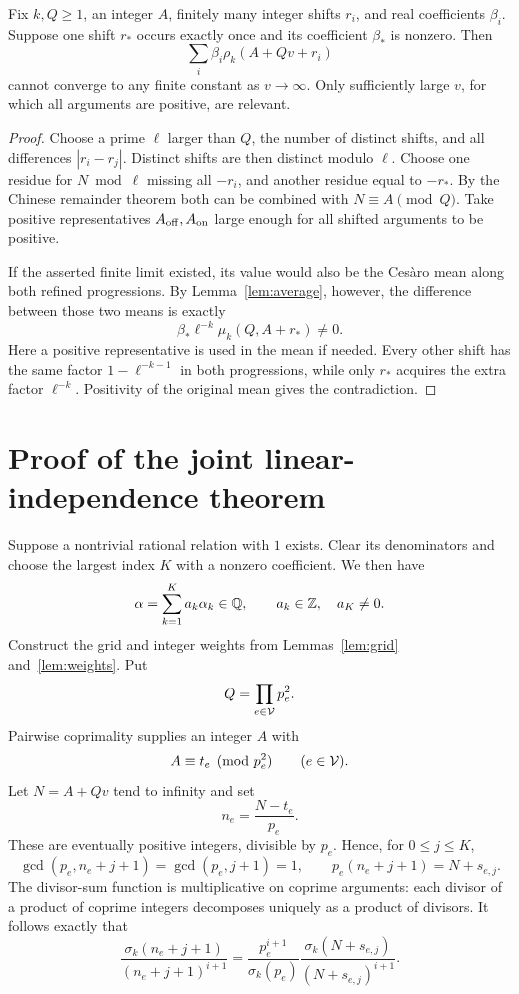 \begin{proposition}\label{prop:nolimit}
Fix $k,Q\geq1$, an integer $A$, finitely many integer shifts $r_i$,
and real coefficients $\beta_i$. Suppose one shift $r_*$ occurs
exactly once and its coefficient $\beta_*$ is nonzero. Then
\[
 \sum_i\beta_i\rho_k(A+Qv+r_i)
\]
cannot converge to any finite constant as $v\to\infty$.
Only sufficiently large $v$, for which all arguments are positive,
are relevant.
\end{proposition}
\begin{proof}
Choose a prime $\ell$ larger than $Q$, the number of distinct shifts,
and all differences $|r_i-r_j|$. Distinct shifts are then distinct
modulo $\ell$. Choose one residue for $N\bmod\ell$ missing all
$-r_i$, and another residue equal to $-r_*$. By the Chinese
remainder theorem both can be combined with $N\equiv A\pmod Q$.
Take positive representatives $A_{\rm off},A_{\rm on}$ large enough
for all shifted arguments to be positive.

If the asserted finite limit existed, its value would also be the
Ces\`aro mean along both refined progressions. By
Lemma~\ref{lem:average}, however, the difference between those two
means is exactly
\begin{equation}\label{eq:difference}
 \beta_*\ell^{-k}\mu_k(Q,A+r_*)\ne0.
\end{equation}
Here a positive representative is used in the mean if needed.
Every other shift has the same factor $1-\ell^{-k-1}$ in both
progressions, while only $r_*$ acquires the extra factor
$\ell^{-k}$. Positivity of the original mean gives the contradiction.
\end{proof}

\section{Proof of the joint linear-independence theorem}
Suppose a nontrivial rational relation with $1$ exists. Clear its
denominators and choose the largest index $K$ with a nonzero
coefficient. We then have
\[
 \alpha=\sum_{k=1}^{K}a_k\alpha_k\in\mathbb Q,
 \qquad a_k\in\mathbb Z,\quad a_K\ne0.
\]
Construct the grid and integer weights from
Lemmas~\ref{lem:grid} and~\ref{lem:weights}. Put
\[
 Q=\prod_{e\in\mathcal V}p_e^2.
\]
Pairwise coprimality supplies an integer $A$ with
\begin{equation}\label{eq:crt}
 A\equiv t_e\pmod{p_e^2}\qquad(e\in\mathcal V).
\end{equation}
Let $N=A+Qv$ tend to infinity and set
\[
 n_e=\frac{N-t_e}{p_e}.
\]
These are eventually positive integers, divisible by $p_e$. Hence,
for $0\leq j\leq K$,
\[
 \gcd(p_e,n_e+j+1)=\gcd(p_e,j+1)=1,
 \qquad p_e(n_e+j+1)=N+s_{e,j}.
\]
The divisor-sum function is multiplicative on coprime arguments:
each divisor of a product of coprime integers decomposes uniquely
as a product of divisors. It follows exactly that
\begin{equation}\label{eq:rescale}
 \frac{\sigma_k(n_e+j+1)}{(n_e+j+1)^{i+1}}
  =\frac{p_e^{i+1}}{\sigma_k(p_e)}
       \frac{\sigma_k(N+s_{e,j})}{(N+s_{e,j})^{i+1}}.
\end{equation}

